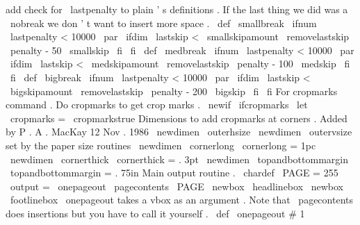 %
%
add
check
for
\
lastpenalty
to
plain
'
s
definitions
.
If
the
last
thing
%
we
did
was
a
\
nobreak
we
don
'
t
want
to
insert
more
space
.
%
\
def
\
smallbreak
{
\
ifnum
\
lastpenalty
<
10000
\
par
\
ifdim
\
lastskip
<
\
smallskipamount
\
removelastskip
\
penalty
-
50
\
smallskip
\
fi
\
fi
}
\
def
\
medbreak
{
\
ifnum
\
lastpenalty
<
10000
\
par
\
ifdim
\
lastskip
<
\
medskipamount
\
removelastskip
\
penalty
-
100
\
medskip
\
fi
\
fi
}
\
def
\
bigbreak
{
\
ifnum
\
lastpenalty
<
10000
\
par
\
ifdim
\
lastskip
<
\
bigskipamount
\
removelastskip
\
penalty
-
200
\
bigskip
\
fi
\
fi
}
%
For
cropmarks
command
.
%
Do
cropmarks
to
get
crop
marks
.
%
\
newif
\
ifcropmarks
\
let
\
cropmarks
=
\
cropmarkstrue
%
%
Dimensions
to
add
cropmarks
at
corners
.
%
Added
by
P
.
A
.
MacKay
12
Nov
.
1986
%
\
newdimen
\
outerhsize
\
newdimen
\
outervsize
%
set
by
the
paper
size
routines
\
newdimen
\
cornerlong
\
cornerlong
=
1pc
\
newdimen
\
cornerthick
\
cornerthick
=
.
3pt
\
newdimen
\
topandbottommargin
\
topandbottommargin
=
.
75in
%
Main
output
routine
.
\
chardef
\
PAGE
=
255
\
output
=
{
\
onepageout
{
\
pagecontents
\
PAGE
}
}
\
newbox
\
headlinebox
\
newbox
\
footlinebox
%
\
onepageout
takes
a
vbox
as
an
argument
.
Note
that
\
pagecontents
%
does
insertions
but
you
have
to
call
it
yourself
.
\
def
\
onepageout
#
1
